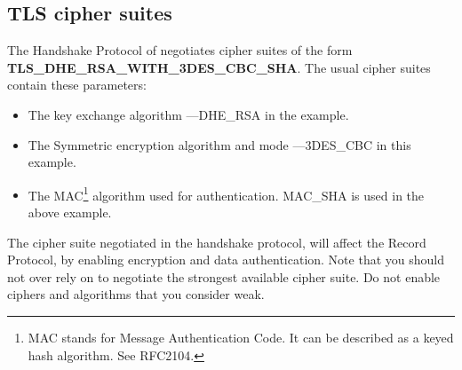 \subsection{TLS cipher suites}
\par 
The Handshake Protocol of \tlsI{} negotiates cipher suites 
of the form \\
{\bf TLS\_DHE\_RSA\_WITH\_3DES\_CBC\_SHA}.
The usual cipher suites contain these parameters:
\begin{itemize}
\item The key exchange algorithm ---DHE\_RSA in the example.
\item The Symmetric encryption algorithm and mode ---3DES\_CBC in this
example.
\item The MAC\footnote{MAC stands for Message Authentication Code. It can
be described as a keyed hash algorithm. See RFC2104.} algorithm used for authentication.
MAC\_SHA is used in the above example.
\end{itemize}

The cipher suite negotiated in the handshake protocol, will affect 
the Record Protocol, by enabling encryption and data authentication.
Note that you should not over rely on \tls{} to negotiate the strongest 
available cipher suite. Do not enable
ciphers and algorithms that you consider weak.

\addvspace{1.5cm}


